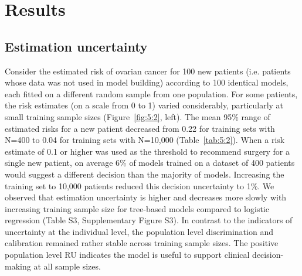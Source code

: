 \section{Results}

\subsection{Estimation uncertainty}

Consider the estimated risk of ovarian cancer for 100 new patients (i.e. patients whose data was not used in model building) according to 100 identical models, each fitted on a different random sample from one population. For some patients, the risk estimates (on a scale from 0 to 1) varied considerably, particularly at small training sample sizes (Figure~\ref{fig:5:2}, left). The mean 95\% range of estimated risks for a new patient decreased from 0.22 for training sets with N=400 to 0.04 for training sets with N=10,000 (Table~\ref{tab:5:2}). When a risk estimate of 0.1 or higher was used as the threshold to recommend surgery for a single new patient, on average 6\% of models trained on a dataset of 400 patients would suggest a different decision than the majority of models. Increasing the training set to 10,000 patients reduced this decision uncertainty to 1\%. We observed that estimation uncertainty is higher and decreases more slowly with increasing training sample size for tree-based models compared to logistic regression (Table S3, Supplementary Figure S3). In contrast to the indicators of uncertainty at the individual level, the population level discrimination and calibration remained rather stable across training sample sizes. The positive population level RU indicates the model is useful to support clinical decision-making at all sample sizes.

